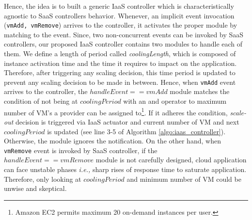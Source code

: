 Hence, the idea is to built a generic IaaS controller which is characteristically agnostic to SaaS controllers behavior. Whenever, an implicit event invocation (\texttt{vmAdd, vmRemove}) arrives to the controller, it activates the proper module by matching to the event. Since, two non-concurrent events can be invoked by SaaS controllers, our proposed IaaS controller contains two modules to handle each of them. We define a length of period called \emph{coolingLength}, which is composed of instance activation time and the time it requires to impact on the application. Therefore, after triggering any scaling decision, this time period is updated to prevent any scaling decision to be made in between. Hence, when \texttt{vmAdd} event arrives to the controller, the $handleEvent == vmAdd$ module matches the condition of not being at $coolingPeriod$ with an and operator 
to maximum number of VM's a provider can be assigned to\footnote{Amazon EC2 permits maximum 20 on-demand instances per user.}. If it adheres the condition, \emph{scale-out} decision is triggered via IaaS actuator and current number of VM and next $coolingPeriod$ is updated (see line 3-5 of Algorithm \ref{algo:iaas_controller}). Otherwise, the module ignores the notification. On the other hand, when \texttt{vmRemove} event is invoked by SaaS controller, if the $handleEvent == vmRemove$ module is not carefully designed, cloud application can face unstable phases \emph{i.e.,} sharp rises of response time to saturate application. Therefore, only looking at $coolingPeriod$ and minimum number of VM
 could be unwise and skeptical. 
 
